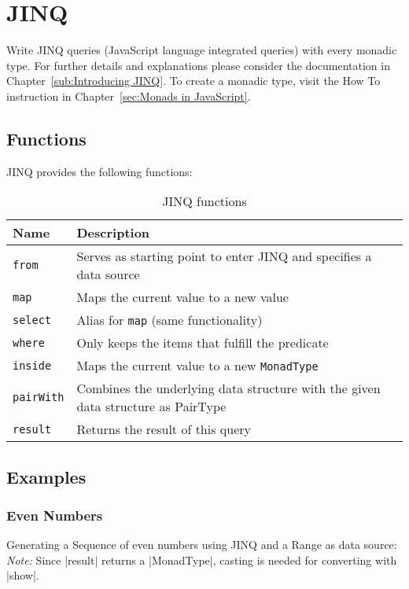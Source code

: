 \section{JINQ} %
\label{sec:API_JINQ}
Write JINQ queries (JavaScript language integrated queries) with every monadic type.
\newline
For further details and explanations please consider the documentation in
Chapter~\ref{sub:Introducing JINQ}.
\newline
To create a monadic type, visit the How To instruction in
Chapter~\ref{sec:Monads in JavaScript}.%


\subsection{Functions}
\label{sub:JINQ_Functions}
JINQ provides the following functions:

\begin{table}[H]
  \centering
  \begin{tabularx}{\textwidth}{| l | X |} \hline
    \textbf{Name}       & \textbf{Description} \\ \hline
    \texttt{from}       & Serves as starting point to enter JINQ and specifies a data source \\ \hline 
    \texttt{map}        & Maps the current value to a new value \\ \hline 
    \texttt{select}     & Alias for \texttt{map} (same functionality) \\ \hline 
    \texttt{where}      & Only keeps the items that fulfill the predicate \\ \hline 
    \texttt{inside}     & Maps the current value to a new \texttt{MonadType} \\ \hline 
    \texttt{pairWith}   & Combines the underlying data structure with the given data structure as  PairType \\ \hline 
    \texttt{result}     & Returns the result of this query\\ \hline 

  \end{tabularx}
  \caption{JINQ functions}
  \label{tab:jinq_functions}
\end{table}

\subsection{Examples}
\label{sub:JINQ_Examples}

\subsubsection{Even Numbers}
\label{subsub:JINQ_Even Numbers}
Generating a Sequence of even numbers using JINQ and a Range as data source:
\newline
\textit{Note:} Since |result| returns a |MonadType|, casting is needed
for converting with |show|.

